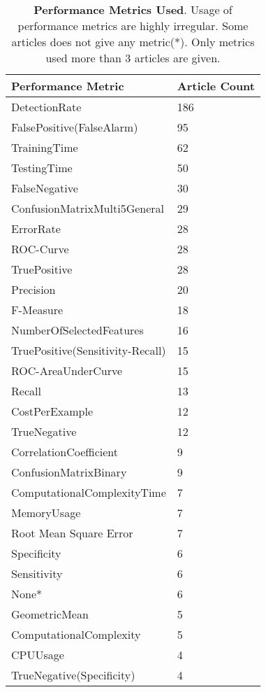 
\begin{table}[!ht]
\centering 
    \caption{ \textbf{Performance Metrics Used}. Usage of performance metrics are highly irregular. Some articles does not give any metric(*). Only metrics used more than 3 articles are given. }
  \scriptsize
     \label{table-metaPerformanceMetrics}

\begin{tabular}{ll}

\toprule

\textbf{Performance Metric}          & \textbf{Article Count} \\

\midrule
DetectionRate & 186 \\ 
FalsePositive(FalseAlarm) & 95 \\ 
TrainingTime & 62 \\ 
TestingTime & 50 \\ 
FalseNegative & 30 \\ 
ConfusionMatrixMulti5General & 29 \\ 
ErrorRate & 28 \\ 
ROC-Curve & 28 \\ 
TruePositive & 28 \\ 
Precision & 20 \\ 
F-Measure & 18 \\ 
NumberOfSelectedFeatures & 16 \\ 
TruePositive(Sensitivity-Recall) & 15 \\ 
ROC-AreaUnderCurve & 15 \\ 
Recall & 13 \\ 
CostPerExample & 12 \\ 
TrueNegative & 12 \\ 
CorrelationCoefficient & 9 \\ 
ConfusionMatrixBinary & 9 \\ 
ComputationalComplexityTime & 7 \\ 
MemoryUsage & 7 \\ 
Root Mean Square Error & 7 \\ 
Specificity & 6 \\ 
Sensitivity & 6 \\ 
\rowcolor{Gray}
None*  & 6 \\ 
GeometricMean & 5 \\ 
ComputationalComplexity & 5 \\ 
CPUUsage & 4 \\ 
TrueNegative(Specificity) & 4 \\ 

\bottomrule

\end{tabular}

\end{table}

